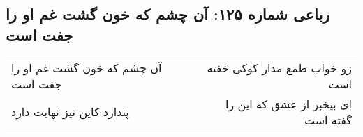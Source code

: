 \begin{center}
\section*{رباعی شماره ۱۲۵: آن چشم که خون گشت غم او را جفت است}
\label{sec:0125}
\begin{longtable}{l p{0.5cm} r}
آن چشم که خون گشت غم او را جفت است
&&
زو خواب طمع مدار کوکی خفته است
\\
پندارد کاین نیز نهایت دارد
&&
ای بیخبر از عشق که این را گفته است
\\
\end{longtable}
\end{center}
